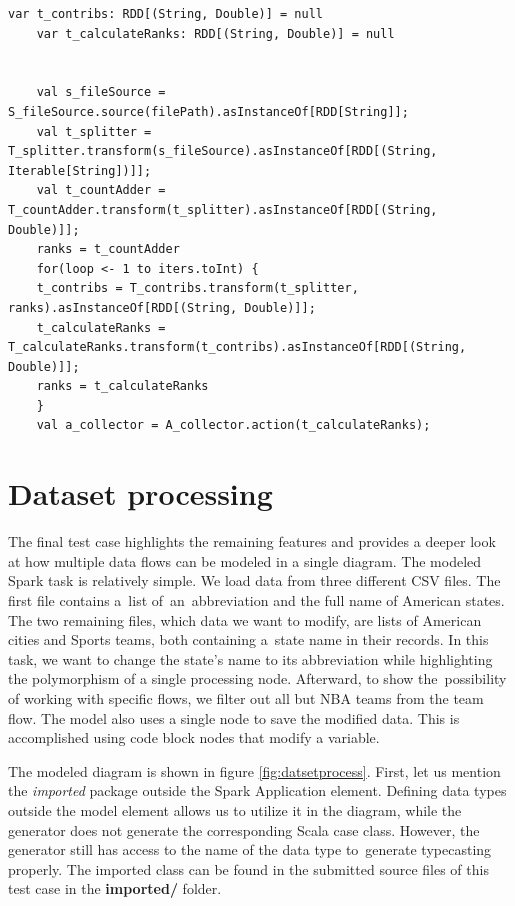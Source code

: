 \begin{lstlisting}[style=myScalastyle, caption={The Page Rank computation}, label={lst:pagerankloop}]
    var t_contribs: RDD[(String, Double)] = null
    var t_calculateRanks: RDD[(String, Double)] = null
    		
    
    val s_fileSource = S_fileSource.source(filePath).asInstanceOf[RDD[String]];
    val t_splitter = T_splitter.transform(s_fileSource).asInstanceOf[RDD[(String, Iterable[String])]];
    val t_countAdder = T_countAdder.transform(t_splitter).asInstanceOf[RDD[(String, Double)]];
    ranks = t_countAdder
    for(loop <- 1 to iters.toInt) {
    t_contribs = T_contribs.transform(t_splitter, ranks).asInstanceOf[RDD[(String, Double)]];
    t_calculateRanks = T_calculateRanks.transform(t_contribs).asInstanceOf[RDD[(String, Double)]];
    ranks = t_calculateRanks
    }
    val a_collector = A_collector.action(t_calculateRanks);
\end{lstlisting}


\section{Dataset processing}
\label{sec:sqlprocess}

The final test case highlights the remaining features and provides a deeper look at how multiple data flows can be modeled in a single diagram. The modeled Spark task is relatively simple. We load data from three different CSV files. The first file contains a~list of~an~abbreviation and the full name of American states. The two remaining files, which data we want to modify, are lists of American cities and Sports teams, both containing a~state name in their records. In this task, we want to change the state's name to its abbreviation while highlighting the polymorphism of a single processing node. Afterward, to show the~possibility of working with specific flows, we filter out all but NBA teams from the team flow. The model also uses a single node to save the modified data. This is accomplished using code block nodes that modify a variable.



The modeled diagram is shown in figure \ref{fig:datsetprocess}. First, let us mention the \textit{imported} package outside the Spark Application element. Defining data types outside the model element allows us to utilize it in the diagram, while the generator does not generate the corresponding Scala case class. However, the generator still has access to the name of the data type to~generate typecasting properly. The imported class can be found in the submitted source files of this test case in the \textbf{imported/} folder.


